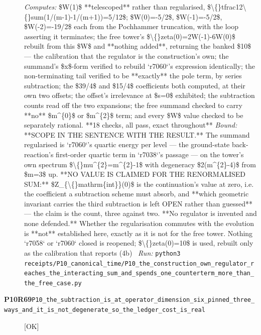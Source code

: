 \begin{description}
\emph{Computes:} \$W(1)\$ **telescoped** rather than regularised, \$\textbackslash\{\}tfrac12\textbackslash\{\}sum(1/(m-1)-1/(m+1))=5/12\$; \$W(0)=-5/2\$, \$W(-1)=-5/2\$, \$W(-2)=-19/2\$ each from the Pochhammer truncation, with the loop asserting it terminates; the free tower's \$\textbackslash\{\}zeta(0)=2W(-1)-6W(0)\$ rebuilt from this \$W\$ and **nothing added**, returning the banked \$10\$ --- the calibration that the regulator is the construction's own; the summand's \$x\$-form verified to rebuild `r7060`'s expression identically; the non-terminating tail verified to be **exactly** the pole term, by series subtraction; the \$39/4\$ and \$15/4\$ coefficients both computed, at their own two offsets; the offset's irrelevance at \$s=0\$ exhibited; the subtraction counts read off the two expansions; the free summand checked to carry **no** \$m\textasciicircum{}\{0\}\$ or \$m\textasciicircum{}\{2\}\$ term; and every \$W\$ value checked to be separately rational. **18 checks, all pass, exact throughout**
 \emph{Bound:}  **SCOPE IN THE SENTENCE WITH THE RESULT.** The summand regularised is `r7060`'s quartic energy per level --- the ground-state back-reaction's first-order quartic term in `r7038`'s passage --- on the tower's own spectrum \$\textbackslash\{\}mu\textasciicircum{}\{2\}=m\textasciicircum{}\{2\}-1\$ with degeneracy \$2(m\textasciicircum{}\{2\}-4)\$ from \$m=3\$ up.  **NO VALUE IS CLAIMED FOR THE RENORMALISED SUM:** \$Z\_\{\textbackslash\{\}mathrm\{int\}\}(0)\$ is the continuation's value at zero, i.e. the coefficient a subtraction scheme must absorb, and **which geometric invariant carries the third subtraction is left OPEN rather than guessed** --- the claim is the count, three against two. **No regulator is invented and none defended.** Whether the regularisation commutes with the evolution is **not** established here, exactly as it is not for the free tower. Nothing `r7058` or `r7060` closed is reopened; \$\textbackslash\{\}zeta(0)=10\$ is used, rebuilt only as the calibration that reports (4b)
\ \emph{Run:} \texttt{python3 receipts/P10\_canonical\_time/P10\_the\_construction\_own\_regulator\_reaches\_the\_interacting\_sum\_and\_spends\_one\_counterterm\_more\_than\_the\_free\_case.py}
\item[\rcptlabel{P10_the_subtraction_is_at_operator_dimension_six_pinned_three_ways_and_it_is_not_degenerate_so_the_ledger_cost_is_real}{P10R69}\textbf{P10R69}\quad\texttt{P10\_the\_subtraction\_is\_at\_operator\_dimension\_six\_pinned\_three\_ways\_and\_it\_is\_not\_degenerate\_so\_the\_ledger\_cost\_is\_real}]\hfill\textsf{[OK]}\\

\end{description}
